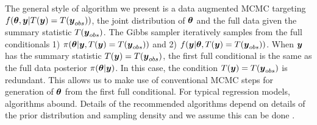\documentclass[ba]{imsart}
\def\bth{\mbox{\boldmath $\theta$}}
\newcommand{\by}{\mbox{\boldmath $y$}}
\begin{document}
The general style of algorithm we present is a data augmented
MCMC targeting $f(\bth, \by |
T(\by)=T(\by_{obs}))$, the joint distribution of $\bth$ and the full
data given the summary statistic $T(\by_{obs})$. 
 The Gibbs sampler \citep{gelfand1990} iteratively samples from the
 full conditionals 1) $\pi(\bth|\by, T(\by)=T(\by_{obs}))$ and 2) $f(\by|\bth, T(\by)=T(\by_{obs}))$.  When $\by$ has the summary statistic $T(\by) = T(\by_{obs})$,
the first full conditional is the same as the full data posterior $\pi(\bth|\by)$. In this case, the condition $T(\by) = T(\by_{obs})$ is redundant.  This allows us to make use of conventional MCMC steps for generation of $\bth$ from the first full conditional.  For typical regression models, algorithms abound. Details of the recommended algorithms depend on details of
the prior distribution and sampling density and we assume this can be done \citep[see e.g.,][]{liu1994, liang2008}.  
\end{document}
